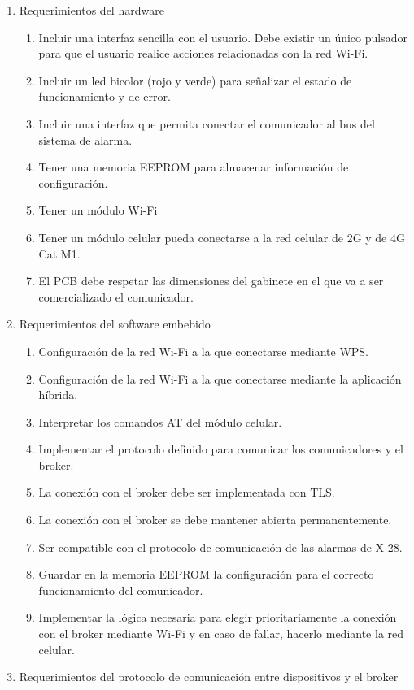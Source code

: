 \documentclass[
11pt, %
codirector, %
]{charter}
\begin{document}
\begin{enumerate}
	\item Requerimientos del hardware
		\begin{enumerate}
			\item Incluir una interfaz sencilla con el usuario. Debe existir un único pulsador para que el usuario realice acciones relacionadas con la red Wi-Fi.
			\item Incluir un led bicolor (rojo y verde) para señalizar el estado de funcionamiento y de error.
			\item Incluir una interfaz que permita conectar el comunicador al bus del sistema de alarma.
			\item Tener una memoria EEPROM para almacenar información de configuración.
			\item Tener un módulo Wi-Fi
			\item Tener un módulo celular pueda conectarse a la red celular de 2G y de 4G Cat M1.
			\item El PCB debe respetar las dimensiones del gabinete en el que va a ser comercializado el comunicador.
		\end{enumerate}
	\item Requerimientos del software embebido
		\begin{enumerate}
			\item Configuración de la red Wi-Fi a la que conectarse mediante WPS.
			\item Configuración de la red Wi-Fi a la que conectarse mediante la aplicación híbrida.
			\item Interpretar los comandos AT del módulo celular.
			\item Implementar el protocolo definido para comunicar los comunicadores y el broker.
			\item La conexión con el broker debe ser implementada con TLS.
			\item La conexión con el broker se debe mantener abierta permanentemente.
			\item Ser compatible con el protocolo de comunicación de las alarmas de X-28.
			\item Guardar en la memoria EEPROM la configuración para el correcto funcionamiento del comunicador.
			\item Implementar la lógica necesaria para elegir prioritariamente la conexión con el broker mediante Wi-Fi y en caso de fallar, hacerlo mediante la red celular.
		\end{enumerate}
	\item Requerimientos del protocolo de comunicación entre dispositivos y el broker

\end{enumerate}
\end{document}
